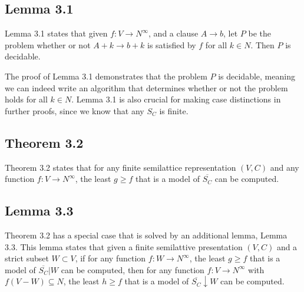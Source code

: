 \subsection{Lemma 3.1}
\label{ssec:lemma_3_1}

Lemma 3.1 states that given $f : V \rightarrow N^{\infty}$,
and a clause $A \rightarrow b$, let $P$ be the problem whether or not
$A + k \rightarrow b + k$ is satisfied by $f$ for all $k \in N$.
Then $P$ is decidable. \cite[p.~3]{mbezem}

The proof of Lemma 3.1 demonstrates that the problem $P$
is decidable, meaning we can indeed write an algorithm that
determines whether or not the problem holds for all $k \in N$.
Lemma 3.1 is also crucial for making case distinctions
in further proofs, since we know that any $S_C$ is finite.

\subsection{Theorem 3.2}
\label{ssec:theorem_3_2}

Theorem 3.2 states that for any finite semilattice representation
$(V, C)$ and any function $f : V \rightarrow N^{\infty}$,
the least $g \ge f$ that is a model of $\overline{S_C}$ can be computed.
\cite[p.~3]{mbezem}

\subsection{Lemma 3.3}
\label{ssec:lemma_3_3}

Theorem 3.2 has a special case that is solved by an additional lemma,
Lemma 3.3. This lemma states that given a finite semilattive presentation
$(V, C)$ and a strict subset $W \subset V$, if for any function
$f : W \rightarrow N^{\infty}$, the least $g \ge f$ that is a model of
$\overline{S_C}|W$ can be computed, then for any function
$f : V \rightarrow N^{\infty}$ with $f(V - W) \subseteq N$,
the least $h \ge f$ that is a model of $\overline{S_C}\downarrow W$ can be computed.
\cite[p.~3-4]{mbezem}
